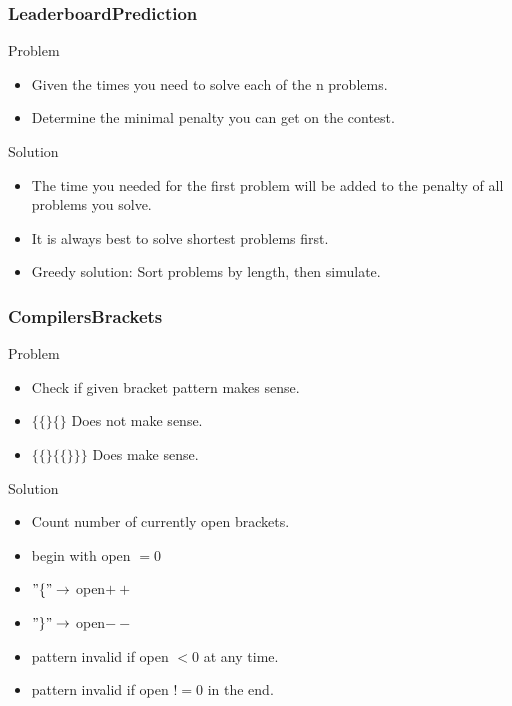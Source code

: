 \documentclass{beamer}
\begin{document}
\begin{frame}
    \frametitle{LeaderboardPrediction}
    \begin{block}{Problem}
        \begin{itemize}
            \item Given the times you need to solve each of the n problems.
            \item Determine the minimal penalty you can get on the contest.
        \end{itemize}
    \end{block}
    \begin{block}{Solution}
        \begin{itemize}
            \item The time you needed for the first problem will be added to the penalty of all problems you solve.
            \item It is always best to solve shortest problems first.
            \item Greedy solution: Sort problems by length, then simulate.
        \end{itemize}
    \end{block}
\end{frame}

\begin{frame}
    \frametitle{CompilersBrackets}
    \begin{block}{Problem}
        \begin{itemize}
            \item Check if given bracket pattern makes sense.
            \item $\{\{\}\{\}$ Does not make sense.
            \item $\{\{\}\{\{\}\}\}$ Does make sense.
        \end{itemize}
    \end{block}
    \begin{block}{Solution}
        \begin{itemize}
            \item Count number of currently open brackets.
            \item begin with open $= 0$
            \item $"\{" \rightarrow$ open$++$
            \item $"\}" \rightarrow$ open$--$
            \item pattern invalid if open $< 0$ at any time.
            \item pattern invalid if open $!= 0$ in the end.
        \end{itemize}
    \end{block}
\end{frame}
\end{document}
